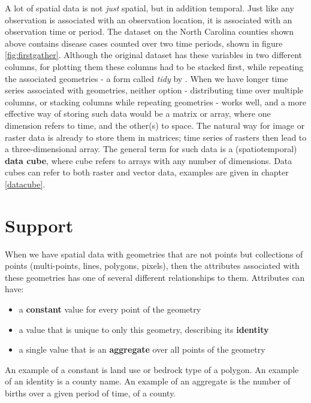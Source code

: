 \documentclass[]{book}
\providecommand{\tightlist}{%
  \setlength{\itemsep}{0pt}\setlength{\parskip}{0pt}}
\begin{document}
A lot of spatial data is not \emph{just} spatial, but in addition temporal. Just like any observation is associated with an observation location, it is associated with an observation time or period. The dataset on the North Carolina counties shown above contains disease cases counted over two time periods, shown in figure \ref{fig:firstgather}. Although the original dataset has these variables in two different columns, for plotting them these columns had to be stacked first, while repeating the associated geometries - a form called \emph{tidy} by \citep{tidy}. When we have longer time series associated with geometries, neither option - distributing time over multiple columns, or stacking columns while repeating geometries - works well, and a more effective way of storing such data would be a matrix or array, where one dimension refers to time, and the other(s) to space. The natural way for image or raster data is already to store them in matrices; time series of rasters then lead to a three-dimensional array. The general term for such data is a (spatiotemporal) \textbf{data cube}, where cube refers to arrays with any number of dimensions. Data cubes can refer to both raster and vector data, examples are given in chapter \ref{datacube}.

\hypertarget{support}{%
\section{Support}\label{support}}

When we have spatial data with geometries that are not points but
collections of points (multi-points, lines, polygons, pixels),
then the attributes associated with these geometries has one
of several different relationships to them. Attributes can have:

\begin{itemize}
\tightlist
\item
  a \textbf{constant} value for every point of the geometry
\item
  a value that is unique to only this geometry, describing its \textbf{identity}
\item
  a single value that is an \textbf{aggregate} over all points of the geometry
\end{itemize}

An example of a constant is land use or bedrock type of a polygon. An
example of an identity is a county name. An example of an aggregate
is the number of births over a given period of time, of a county.
\end{document}
